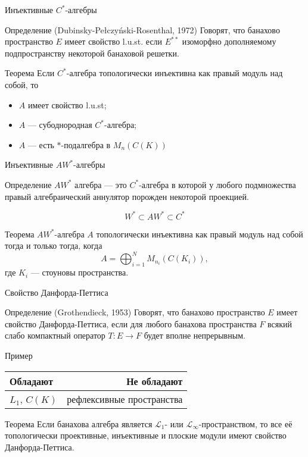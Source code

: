 \documentclass[9pt,pdf,utf8,russian]{beamer}
\begin{document}
\begin{frame}{Инъективные $C^*$-алгебры}
  \begin{block}{Определение (Dubinsky-Pełczyński-Rosenthal, 1972)}
    Говорят, что банахово пространство $E$ имеет свойство l.u.st. если $E^{**}$ изоморфно дополняемому подпространству некоторой банаховой решетки.
  \end{block}
  \pause
  \begin{alertblock}{Теорема}
    Если $C^*$-алгебра топологически инъективна как правый модуль над собой, то
    \begin{itemize}
      \item $A$ имеет свойство l.u.st;
      \item $A$ --- субоднородная $C^*$-алгебра;
      \item $A$ --- есть $*$-подалгебра в $M_n(C(K))$
    \end{itemize}
  \end{alertblock}
\end{frame}

\begin{frame}{Инъективные $AW^*$-алгебры}
  \begin{block}{Определение}
    $AW^*$ алгебра --- это $C^*$-алгебра в которой у любого подмножества правый алгебраический аннулятор порожден некоторой проекцией.
  \end{block}
  \pause
  \[
    W^*\subset AW^*\subset C^*
  \]
  \pause
  \begin{alertblock}{Теорема}
      $AW^*$-алгебра $A$ топологически инъективна как правый модуль над собой тогда и только тогда, когда 
    \[
      A=\bigoplus_{i=1}^N M_{n_i}(C(K_i)),
    \]
    где $K_i$ --- стоуновы пространства.
  \end{alertblock}
\end{frame}

\begin{frame}{Свойство Данфорда-Петтиса}
   \begin{block}{Определение (Grothendieck, 1953)}
     Говорят, что банахово пространство $E$ имеет свойство Данфорда-Петтиса, если для любого банахова пространства $F$ 
     всякий слабо компактный оператор $T:E\to F$ будет вполне непрерывным.
   \end{block}
   \pause
   \begin{exampleblock}{Пример}
    \begin{table}
      \begin{tabular}{lr}
        Обладают & Не обладают\\
        \midrule
        $L_1$, $C(K)$ & рефлексивные пространства\\
      \end{tabular}
    \end{table}
   \end{exampleblock}
   \pause
   \begin{alertblock}{Теорема}
     Если банахова алгебра является $\mathscr{L}_1$- или $\mathscr{L}_\infty$-пространством, 
     то все её топологически проективные, инъективные и плоские модули имеют свойство Данфорда-Петтиса.
   \end{alertblock}
\end{frame}
\end{document}
